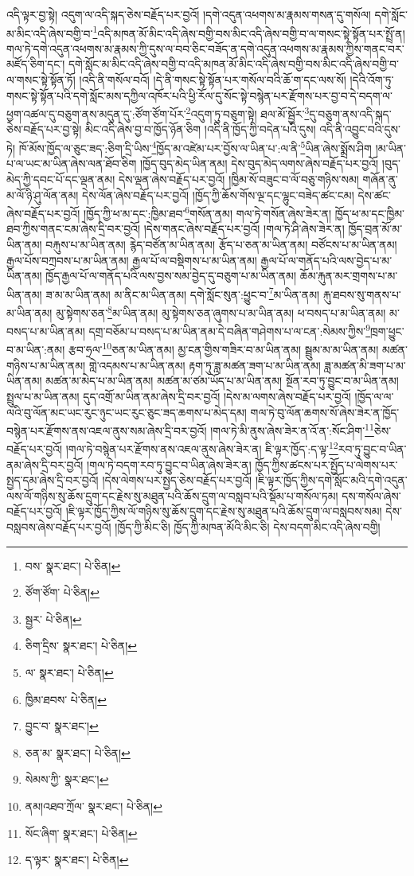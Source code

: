 འདི་ལྟར་བྱ་སྟེ། འདུག་ལ་འདི་སྐད་ཅེས་བརྗོད་པར་བྱའོ། །དགེ་འདུན་འཕགས་མ་རྣམས་གསན་དུ་གསོལ། དགེ་སློང་མ་མིང་འདི་ཞེས་བགྱི་བ་\footnote{བས་  སྣར་ཐང་།  པེ་ཅིན། }འདི་མཁན་མོ་མིང་འདི་ཞེས་བགྱི་བས་མིང་འདི་ཞེས་བགྱི་བ་ལ་གསང་སྟེ་སྟོན་པར་སྤྲོ་ན། གལ་ཏེ་དགེ་འདུན་འཕགས་མ་རྣམས་ཀྱི་དུས་ལ་བབ་ཅིང་བཟོད་ན་དགེ་འདུན་འཕགས་མ་རྣམས་ཀྱིས་གནང་བར་མཛོད་ཅིག་དང་། དགེ་སློང་མ་མིང་འདི་ཞེས་བགྱི་བ་འདི་མཁན་མོ་མིང་འདི་ཞེས་བགྱི་བས་མིང་འདི་ཞེས་བགྱི་བ་ལ་གསང་སྟེ་སྟོན་ཏོ། །འདི་ནི་གསོལ་བའོ། །དེ་ནི་གསང་སྟེ་སྟོན་པར་གསོལ་བའི་ཆོ་ག་དང་ལས་སོ། །དེའི་འོག་ཏུ་གསང་སྟེ་སྟོན་པའི་དགེ་སློང་མས་དཀྱིལ་འཁོར་པའི་ཕྱི་རོལ་དུ་སོང་སྟེ་བསྙེན་པར་རྫོགས་པར་བྱ་བ་དེ་བདག་ལ་ཕྱག་འཚལ་དུ་བཅུག་ནས་མདུན་དུ་:ཙོག་ཙོག་པོར་\footnote{ཙོག་ཙོག་  པེ་ཅིན། }འདུག་ཏུ་བཅུག་སྟེ། ཐལ་མོ་སྦྱོར་\footnote{སྦྱར་  པེ་ཅིན། }དུ་བཅུག་ནས་འདི་སྐད་ཅེས་བརྗོད་པར་བྱ་སྟེ། མིང་འདི་ཞེས་བྱ་བ་ཁྱོད་ཉོན་ཅིག །འདི་ནི་ཁྱོད་ཀྱི་བདེན་པའི་དུས། འདི་ནི་འབྱུང་བའི་དུས་ཏེ། ཁོ་མོས་ཁྱོད་ལ་ཅུང་ཟད་:ཅིག་དྲི་ཡིས་\footnote{ཅིག་དྲིས་  སྣར་ཐང་།  པེ་ཅིན། }ཁྱོད་མ་འཛེམ་པར་བྱོས་ལ་ཡིན་པ་:ལ་ནི་\footnote{ལ་  སྣར་ཐང་།  པེ་ཅིན། }ཡིན་ཞེས་སྨྲོས་ཤིག །མ་ཡིན་པ་ལ་ཡང་མ་ཡིན་ཞེས་ལན་ཐོབ་ཅིག །ཁྱོད་བུད་མེད་ཡིན་ནམ། དེས་བུད་མེད་ལགས་ཞེས་བརྗོད་པར་བྱའོ། །བུད་མེད་ཀྱི་དབང་པོ་དང་ལྡན་ནམ། དེས་ལྡན་ཞེས་བརྗོད་པར་བྱའོ། །ཁྱིམ་སོ་བཟུང་བ་ལོ་བཅུ་གཉིས་སམ། གཞོན་ནུ་མ་ལོ་ཉི་ཤུ་ལོན་ནམ། དེས་ལོན་ཞེས་བརྗོད་པར་བྱའོ། །ཁྱོད་ཀྱི་ཆོས་གོས་ལྔ་དང་ལྷུང་བཟེད་ཚང་ངམ། དེས་ཚང་ཞེས་བརྗོད་པར་བྱའོ། །ཁྱོད་ཀྱི་ཕ་མ་དང་:ཁྱིམ་ཐབ་\footnote{ཁྱིམ་ཐབས་  པེ་ཅིན། }གསོན་ནམ། གལ་ཏེ་གསོན་ཞེས་ཟེར་ན། ཁྱོད་ཕ་མ་དང་ཁྱིམ་ཐབ་ཀྱིས་གནང་ངམ་ཞེས་དྲི་བར་བྱའོ། །དེས་གནང་ཞེས་བརྗོད་པར་བྱའོ། །གལ་ཏེ་ཤི་ཞེས་ཟེར་ན། ཁྱོད་བྲན་མོ་མ་ཡིན་ནམ། བརྐུས་པ་མ་ཡིན་ནམ། རྙེད་བཙོན་མ་ཡིན་ནམ། རྩོད་པ་ཅན་མ་ཡིན་ནམ། བཙོངས་པ་མ་ཡིན་ནམ། རྒྱལ་པོས་བཀྲབས་པ་མ་ཡིན་ནམ། རྒྱལ་པོ་ལ་བསྡིགས་པ་མ་ཡིན་ནམ། རྒྱལ་པོ་ལ་གནོད་པའི་ལས་བྱེད་པ་མ་ཡིན་ནམ། ཁྱོད་རྒྱལ་པོ་ལ་གནོད་པའི་ལས་བྱས་སམ་བྱེད་དུ་བཅུག་པ་མ་ཡིན་ནམ། ཆོམ་རྐུན་མར་གྲགས་པ་མ་ཡིན་ནམ། ཟ་མ་མ་ཡིན་ནམ། མ་ནིང་མ་ཡིན་ནམ། དགེ་སློང་སུན་:ཕྱུང་བ་\footnote{བྱུང་བ་  སྣར་ཐང་། }མ་ཡིན་ནམ། རྐུ་ཐབས་སུ་གནས་པ་མ་ཡིན་ནམ། མུ་སྟེགས་ཅན་\footnote{ཅན་མ་  སྣར་ཐང་།  པེ་ཅིན། }མ་ཡིན་ནམ། མུ་སྟེགས་ཅན་ཞུགས་པ་མ་ཡིན་ནམ། ཕ་བསད་པ་མ་ཡིན་ནམ། མ་བསད་པ་མ་ཡིན་ནམ། དགྲ་བཅོམ་པ་བསད་པ་མ་ཡིན་ནམ་དེ་བཞིན་གཤེགས་པ་ལ་ངན་:སེམས་ཀྱིས་\footnote{སེམས་ཀྱི་  སྣར་ཐང་། }ཁྲག་ཕྱུང་བ་མ་ཡིན་:ནམ། རྩབ་ཧྲལ་\footnote{ནམ།འཐབ་ཀྲོལ་  སྣར་ཐང་།  པེ་ཅིན། }ཅན་མ་ཡིན་ནམ། མྱ་ངན་གྱིས་གཟིར་བ་མ་ཡིན་ནམ། སྦྲུམ་མ་མ་ཡིན་ནམ། མཚན་གཉིས་པ་མ་ཡིན་ནམ། གླེ་འདམས་པ་མ་ཡིན་ནམ། རྟག་ཏུ་ཟླ་མཚན་ཟག་པ་མ་ཡིན་ནམ། ཟླ་མཚན་མི་ཟག་པ་མ་ཡིན་ནམ། མཚན་མ་མེད་པ་མ་ཡིན་ནམ། མཚན་མ་ཙམ་ཡོད་པ་མ་ཡིན་ནམ། སྔོན་རབ་ཏུ་བྱུང་བ་མ་ཡིན་ནམ། སྤྲུལ་པ་མ་ཡིན་ནམ། དུད་འགྲོ་མ་ཡིན་ནམ་ཞེས་དྲི་བར་བྱའོ། །དེས་མ་ལགས་ཞེས་བརྗོད་པར་བྱའོ། །ཁྱོད་ལ་ལ་ལའི་བུ་ལོན་མང་ཡང་རུང་ཉུང་ཡང་རུང་ཅུང་ཟད་ཆགས་པ་མེད་དམ། གལ་ཏེ་བུ་ལོན་ཆགས་སོ་ཞེས་ཟེར་ན་ཁྱོད་བསྙེན་པར་རྫོགས་ནས་འཇལ་ནུས་སམ་ཞེས་དྲི་བར་བྱའོ། །གལ་ཏེ་མི་ནུས་ཞེས་ཟེར་ན་འོ་ན་:སོང་ཤིག་\footnote{སོང་ཞིག་  སྣར་ཐང་།  པེ་ཅིན། }ཅེས་བརྗོད་པར་བྱའོ། །གལ་ཏེ་བསྙེན་པར་རྫོགས་ནས་འཇལ་ནུས་ཞེས་ཟེར་ན། ཇི་ལྟར་ཁྱོད་:ད་ལྟ་\footnote{ད་ལྟར་  སྣར་ཐང་།  པེ་ཅིན། }རབ་ཏུ་བྱུང་བ་ཡིན་ནམ་ཞེས་དྲི་བར་བྱའོ། །གལ་ཏེ་བདག་རབ་ཏུ་བྱུང་བ་ཡིན་ཞེས་ཟེར་ན། ཁྱོད་ཀྱིས་ཚངས་པར་སྤྱོད་པ་ལེགས་པར་སྤྱད་དམ་ཞེས་དྲི་བར་བྱའོ། །དེས་ལེགས་པར་སྤྱད་ཅེས་བརྗོད་པར་བྱའོ། །ཇི་ལྟར་ཁྱོད་ཀྱིས་དགེ་སློང་མའི་དགེ་འདུན་ལས་ལོ་གཉིས་སུ་ཆོས་དྲུག་དང་རྗེས་སུ་མཐུན་པའི་ཆོས་དྲུག་ལ་བསླབ་པའི་སྡོམ་པ་གསོལ་ཏམ། དས་གསོལ་ཞེས་བརྗོད་པར་བྱའོ། །ཇི་ལྟར་ཁྱོད་ཀྱིས་ལོ་གཉིས་སུ་ཆོས་དྲུག་དང་རྗེས་སུ་མཐུན་པའི་ཆོས་དྲུག་ལ་བསླབས་སམ། དེས་བསླབས་ཞེས་བརྗོད་པར་བྱའོ། །ཁྱོད་ཀྱི་མིང་ཅི། ཁྱོད་ཀྱི་མཁན་མོའི་མིང་ཅི། དེས་བདག་མིང་འདི་ཞེས་བགྱི། 